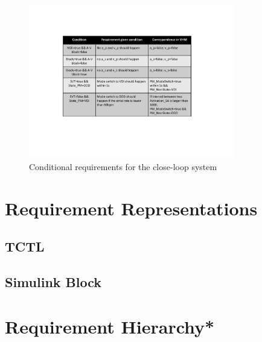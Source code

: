 \begin{figure}[!b]
	\center
	\includegraphics[width=0.8\textwidth]{figs/conditional.pdf}
	\center
	\caption{Conditional requirements for the close-loop system}
	\label{fig:conditional}
\end{figure}
\section{Requirement Representations}
\subsection{TCTL}
\subsection{Simulink Block}
 
\section{Requirement Hierarchy*}
